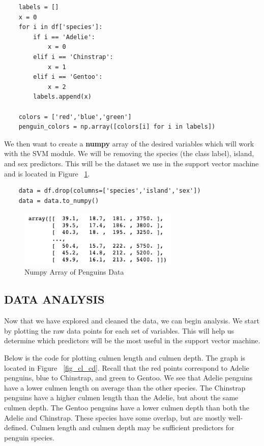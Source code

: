 \documentclass[12pt]{article}
\begin{document}
\begin{verbatim}
    labels = []
    x = 0
    for i in df['species']:
        if i == 'Adelie':
            x = 0
        elif i == 'Chinstrap':
            x = 1
        elif i == 'Gentoo':
            x = 2
        labels.append(x)
    
    colors = ['red','blue','green']
    penguin_colors = np.array([colors[i] for i in labels])
\end{verbatim}

We then want to create a \textbf{numpy} array of the desired variables which will work with the SVM module. We will be removing the species (the class label), island, and sex predictors. This will be the dataset we use in the support vector machine and is located in Figure ~\ref{fig_penguins_numpy}.

\begin{verbatim}
    data = df.drop(columns=['species','island','sex'])
    data = data.to_numpy()
\end{verbatim}

\begin{figure}[H]
    \centering
    \includegraphics[width=3in]{Figures/penguins/penguins_numpy_data.png}
    \caption{Numpy Array of Penguins Data}
    \label{fig_penguins_numpy}
\end{figure}

\subsection{DATA ANALYSIS}

Now that we have explored and cleaned the data, we can begin analysis. We start by plotting the raw data points for each set of variables. This will help us determine which predictors will be the most useful in the support vector machine.

Below is the code for plotting culmen length and culmen depth. The graph is located in Figure ~\ref{fig_cl_cd}. Recall that the red points correspond to Adelie penguins, blue to Chinstrap, and green to Gentoo. We see that Adelie penguins have a lower culmen length on average than the other species. The Chinstrap penguins have a higher culmen length than the Adelie, but about the same culmen depth. The Gentoo penguins have a lower culmen depth than both the Adelie and Chinstrap. These species have some overlap, but are mostly well-defined. Culmen length and culmen depth may be sufficient predictors for penguin species.
\end{document}
